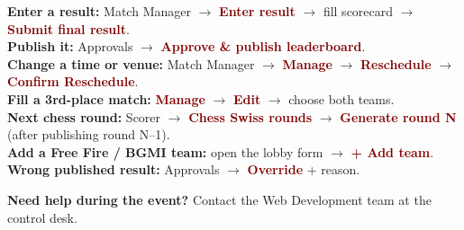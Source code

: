 \documentclass[11pt,a4paper]{article}
\newcommand{\ui}[1]{\textbf{\textcolor{maroon}{#1}}}
\begin{document}
\begin{tcolorbox}[colback=softgrey,colframe=maroon]
\textbf{Enter a result:} Match Manager $\rightarrow$ \ui{Enter result} $\rightarrow$ fill scorecard $\rightarrow$ \ui{Submit final result}.\\
\textbf{Publish it:} Approvals $\rightarrow$ \ui{Approve \& publish leaderboard}.\\
\textbf{Change a time or venue:} Match Manager $\rightarrow$ \ui{Manage} $\rightarrow$ \ui{Reschedule} $\rightarrow$ \ui{Confirm Reschedule}.\\
\textbf{Fill a 3rd-place match:} \ui{Manage} $\rightarrow$ \ui{Edit} $\rightarrow$ choose both teams.\\
\textbf{Next chess round:} Scorer $\rightarrow$ \ui{Chess Swiss rounds} $\rightarrow$ \ui{Generate round N} (after publishing round N--1).\\
\textbf{Add a Free Fire / BGMI team:} open the lobby form $\rightarrow$ \ui{+ Add team}.\\
\textbf{Wrong published result:} Approvals $\rightarrow$ \ui{Override} + reason.
\end{tcolorbox}

\vspace{0.5cm}
\textbf{Need help during the event?} Contact the Web Development team at the control desk.
\end{document}
